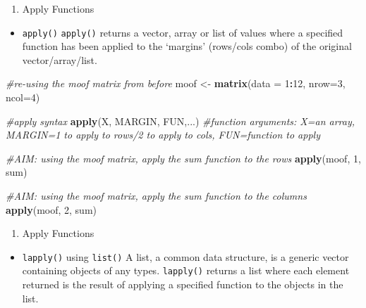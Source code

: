 \documentclass[]{book}
\newenvironment{Shaded}{\begin{snugshade}}{\end{snugshade}}
\newcommand{\CommentTok}[1]{\textcolor[rgb]{0.56,0.35,0.01}{\textit{#1}}}
\newcommand{\DataTypeTok}[1]{\textcolor[rgb]{0.13,0.29,0.53}{#1}}
\newcommand{\DecValTok}[1]{\textcolor[rgb]{0.00,0.00,0.81}{#1}}
\newcommand{\KeywordTok}[1]{\textcolor[rgb]{0.13,0.29,0.53}{\textbf{#1}}}
\newcommand{\NormalTok}[1]{#1}
\newcommand{\OperatorTok}[1]{\textcolor[rgb]{0.81,0.36,0.00}{\textbf{#1}}}
\newcommand{\StringTok}[1]{\textcolor[rgb]{0.31,0.60,0.02}{#1}}
\providecommand{\tightlist}{%
  \setlength{\itemsep}{0pt}\setlength{\parskip}{0pt}}
\begin{document}
\begin{enumerate}
\def\labelenumi{\arabic{enumi}.}
\setcounter{enumi}{16}
\tightlist
\item
  Apply Functions
\end{enumerate}

\begin{itemize}
\tightlist
\item
  \texttt{apply()}
  \texttt{apply()} returns a vector, array or list of values where a specified function has been applied to the `margins' (rows/cols combo) of the original vector/array/list.
\end{itemize}

\begin{Shaded}
\begin{Highlighting}[]
\CommentTok{#re-using the moof matrix from before}
\NormalTok{moof <-}\StringTok{ }\KeywordTok{matrix}\NormalTok{(}\DataTypeTok{data =} \DecValTok{1}\OperatorTok{:}\DecValTok{12}\NormalTok{, }\DataTypeTok{nrow=}\DecValTok{3}\NormalTok{, }\DataTypeTok{ncol=}\DecValTok{4}\NormalTok{) }

\CommentTok{#apply syntax}
\KeywordTok{apply}\NormalTok{(X, MARGIN, FUN,...) }\CommentTok{#function arguments: X=an array, MARGIN=1 to apply to rows/2 to apply to cols, FUN=function to apply}

\CommentTok{#AIM: using the moof matrix, apply the sum function to the rows}
\KeywordTok{apply}\NormalTok{(moof, }\DecValTok{1}\NormalTok{, sum) }

\CommentTok{#AIM: using the moof matrix, apply the sum function to the columns}
\KeywordTok{apply}\NormalTok{(moof, }\DecValTok{2}\NormalTok{, sum) }
\end{Highlighting}
\end{Shaded}

\begin{enumerate}
\def\labelenumi{\arabic{enumi}.}
\setcounter{enumi}{17}
\tightlist
\item
  Apply Functions
\end{enumerate}

\begin{itemize}
\tightlist
\item
  \texttt{lapply()} using \texttt{list()}
  A list, a common data structure, is a generic vector containing objects of any types.
  \texttt{lapply()} returns a list where each element returned is the result of applying a specified function to the objects in the list.
\end{itemize}
\end{document}
